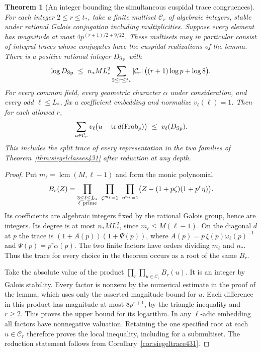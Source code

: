 \documentclass[a4paper,11pt]{article}
\newtheorem{theorem}[proposition]{Theorem}
\theoremstyle{definition}
\theoremstyle{remark}
\numberwithin{equation}{section}
\begin{document}
\begin{theorem}[An integer bounding the simultaneous cuspidal trace congruences]\leavevmode
\label{thm:commonsptrace433}
For each integer \(2\le r\le t_*\), take a finite multiset
\(\mathcal C_r\) of algebraic integers, stable under rational
Galois conjugation including multiplicities. Suppose every
element has magnitude at most \(4p^{(r+1)/2+9/22}\).
These multisets may in particular consist of integral traces
whose conjugates have the cuspidal realizations of the lemma.
There is a positive rational integer \(D_{\rm Sp}\) with
\[
\begin{split}
 \log D_{\rm Sp}\ \le\ 
 n_* M L_*^2\sum_{2\le r\le t_*}|\mathcal C_r|\,
         \big((r+1)\log p+\log 8\big).
\end{split}
\]
For every common field, every geometric character \(\alpha\)
under consideration, and every odd \(\ell\le L_*\), fix a
coefficient embedding and normalize \(v_\ell(\ell)=1\).
Then for each allowed \(r\),
\[
 \sum_{u\in\mathcal C_r}v_\ell
          \bigl(u-\operatorname{tr}d(\operatorname{Frob}_p)\bigr)
                     \ \le\ v_\ell(D_{\rm Sp}).
\]
This includes the split trace of every representation in the
two families of Theorem~\ref{thm:siegelclasses431} after
reduction at any depth.
\end{theorem}
\begin{proof}
Put \(m_\ell=\operatorname{lcm}(M,\ell-1)\) and form the
monic polynomial
\[
 B_r(Z)=
 \prod_{\substack{3\le\ell\le L_*\\\ell\ {\rm prime}}}
 \ \prod_{\zeta^{m_\ell}=1}\ \prod_{\eta^{n_*}=1}
                \bigl(Z-(1+p\zeta)(1+p^r\eta)\bigr).
\]
Its coefficients are algebraic integers fixed by the rational
Galois group, hence are integers. Its degree is at most
\(n_* M L_*^2\), since \(m_\ell\le M(\ell-1)\).
On the diagonal \(d\) at \(p\) the trace is
\((1+A(p))(1+\Psi(p))\), where
\(A(p)=p\,\xi(p)\omega_\ell(p)^{-1}\) and
\(\Psi(p)=p^r\alpha(p)\). The two finite factors have orders
dividing \(m_\ell\) and \(n_*\). Thus the trace for every
choice in the theorem occurs as a root of the same \(B_r\).

Take the absolute value of the product
\(\prod_r\prod_{u\in\mathcal C_r}B_r(u)\).
It is an integer by Galois stability. Every factor is nonzero
by the numerical estimate in the proof of the lemma, which
uses only the asserted magnitude bound for \(u\).
Each difference in this product has magnitude at most
\(8p^{r+1}\), by the triangle inequality and \(r\ge2\).
This proves the upper bound for its logarithm. In any
\(\ell\)-adic embedding all factors have nonnegative
valuation. Retaining the one specified root at each
\(u\in\mathcal C_r\) therefore proves the local inequality,
including for a submultiset. The reduction statement follows
from Corollary~\ref{cor:siegeltrace431}.
\end{proof}
\end{document}
